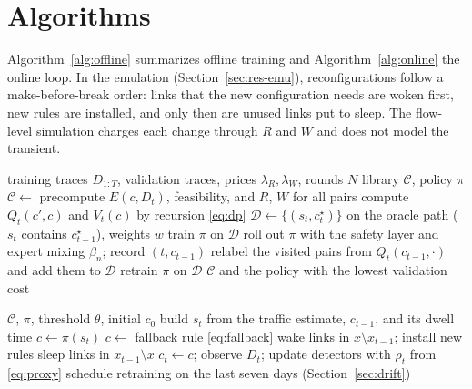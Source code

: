 \documentclass[preprint,12pt]{elsarticle}
\begin{document}
\section{Algorithms}\label{sec:algorithms}

Algorithm~\ref{alg:offline} summarizes offline training and Algorithm~\ref{alg:online} the online loop. In the emulation (Section~\ref{sec:res-emu}), reconfigurations follow a make-before-break order: links that the new configuration needs are woken first, new rules are installed, and only then are unused links put to sleep. The flow-level simulation charges each change through $R$ and $W$ and does not model the transient.

\begin{algorithm}[t]
\caption{LiRA Offline Training}
\label{alg:offline}
\footnotesize
\begin{algorithmic}[1]
\Require training traces $D_{1:T}$, validation traces, prices $\lambda_R,\lambda_W$, rounds $N$
\Ensure library $\mathcal{C}$, policy $\pi$
\State $\mathcal{C}\gets$  
\State precompute $E(c,D_t)$, feasibility, and $R$, $W$ for all pairs
\State compute $Q_t(c',c)$ and $V_t(c)$ by recursion \eqref{eq:dp}
\State $\mathcal{D}\gets\{(s_t,c^\star_t)\}$ on the oracle path ($s_t$ contains $c^\star_{t-1}$), weights $w$
\State train $\pi$ on $\mathcal{D}$
\State roll out $\pi$ with the safety layer and expert mixing $\beta_n$; record $(t,c_{t-1})$
\State relabel the visited pairs from $Q_t(c_{t-1},\cdot)$ and add them to $\mathcal{D}$
\State retrain $\pi$ on $\mathcal{D}$
\EndFor
\State \Return $\mathcal{C}$ and the policy with the lowest validation cost
\end{algorithmic}
\end{algorithm}

\begin{algorithm}[t]
\caption{LiRA Online Control Loop}
\label{alg:online}
\footnotesize
\begin{algorithmic}[1]
\Require $\mathcal{C}$, $\pi$, threshold $\theta$, initial $c_0$
\State build $s_t$ from the traffic estimate, $c_{t-1}$, and its dwell time
\State $c\gets\pi(s_t)$
\State $c\gets$ fallback rule \eqref{eq:fallback}
\EndIf
{}
\State wake links in $x\setminus x_{t-1}$; install new rules
\State sleep links in $x_{t-1}\setminus x$
\EndIf
\State $c_t\gets c$; observe $D_t$; update detectors with $\rho_t$ from \eqref{eq:proxy}
\State schedule retraining on the last seven days (Section~\ref{sec:drift})
\EndIf
\EndFor
\end{algorithmic}
\end{algorithm}
\end{document}
